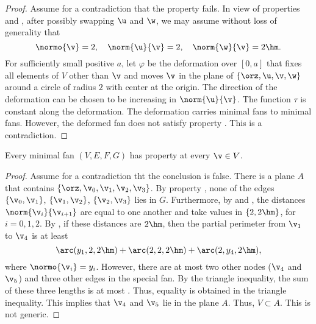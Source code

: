 \begin{proof} Assume for a contradiction that the property fails.  In
view of properties  and ,
after possibly swapping $\u$ and $\w$, we may assume without loss of
generality that
\begin{displaymath}
\normo{\v}=2,\quad \norm{\u}{\v}=2,\quad \norm{\w}{\v}=2\hm.
\end{displaymath}
For sufficiently small positive $a$, let $\varphi$ be the deformation
over $[0,a]$ that fixes all elements of $V$ other than $\v$ and moves
$\v$ in the plane of $\{\orz,\u,\v,\w\}$ around a circle of radius $2$
with center at the origin.  The direction of the deformation can be
chosen to be increasing in $\norm{\u}{\v}$.  The function $\tau$ is
constant along the deformation.  The deformation carries minimal fans
to minimal fans.  However, the deformed fan does not satisfy property
.  This is a contradiction.
\end{proof}




\begin{lemma} Every minimal fan $(V,E,F,G)$ has property
 at every $\v\in V$.
\end{lemma}

\begin{proof} %
Assume for a contradiction tht the conclusion is false.  There is a
plane $A$ that contains $\{\orz,\v_0,\v_1,\v_2,\v_3\}$.  By property
, none of the edges $\{\v_0,\v_1\}$, $\{\v_1,\v_2\}$,
$\{\v_2,\v_3\}$ lies in $G$.  Furthermore, by 
and , the distances $\norm{\v_i}{\v_{i+1}}$ are equal
to one another and take values in $\{2,2\hm\}$, for $i=0,1,2$.  By
, if these distances are $2\hm$, then the partial
perimeter from $\v_1$ to $\v_4$ is at least
\begin{equation}\label{eqn:3side}
\arc(y_1,2,2\hm)+\arc(2,2,2\hm)+\arc(2,y_4,2\hm),
\end{equation}
where $\normo{\v_i}=y_i$.  However, there are at most two other nodes
($\v_4$ and $\v_5$) and three other edges in the special fan.  By the
triangle inequality, the sum of these three lengths is at most
.  Thus, equality is obtained in the triangle
inequality.  This implies that $\v_4$ and $\v_5$ lie in the plane $A$.
Thus, $V\subset A$.  This is not generic.
\end{proof}

